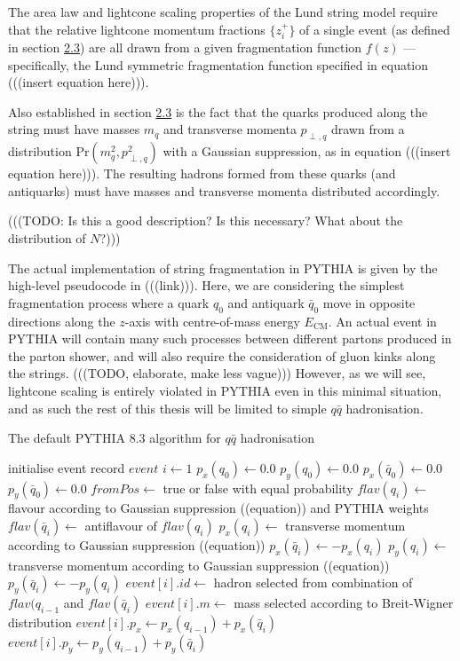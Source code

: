 \documentclass[12pt,a4paper]{report}
\begin{document}
The area law and lightcone scaling properties of the Lund string model require that the relative lightcone momentum fractions $\{ z_i^+ \}$ of a single event (as defined in section \hyperref[sec:lsm]{2.3}) are all drawn from a given fragmentation function $f(z)$ --- specifically, the Lund symmetric fragmentation function specified in equation (((insert equation here))).

Also established in section \hyperref[sec:lsm]{2.3} is the fact that the quarks produced along the string must have masses $m_q$ and transverse momenta $p_{\perp,q}$ drawn from a distribution $\text{Pr}(m_q^2, p_{\perp,q}^2)$ with a Gaussian suppression, as in equation (((insert equation here))). The resulting hadrons formed from these quarks (and antiquarks) must have masses and transverse momenta distributed accordingly.

(((TODO: Is this a good description? Is this necessary? What about the distribution of $N$?)))

The actual implementation of string fragmentation in PYTHIA is given by the high-level pseudocode in (((link))). Here, we are considering the simplest fragmentation process where a quark $q_0$ and antiquark $\bar{q}_0$ move in opposite directions along the $z$-axis with centre-of-mass energy $E_\text{CM}$. An actual event in PYTHIA will contain many such processes between different partons produced in the parton shower, and will also require the consideration of gluon kinks along the strings. (((TODO, elaborate, make less vague))) However, as we will see, lightcone scaling is entirely violated in PYTHIA even in this minimal situation, and as such the rest of this thesis will be limited to simple $q \bar{q}$ hadronisation.

\begin{algorithm}
  \caption{The default PYTHIA 8.3 algorithm for $q\bar{q}$ hadronisation} \label{alg:default}
  \begin{algorithmic}
    \State initialise event record $event$
    \State $i \gets 1$
    \State $p_x(q_0) \gets 0.0$
    \State $p_y(q_0) \gets 0.0$
    \State $p_x(\bar{q}_0) \gets 0.0$
    \State $p_y(\bar{q}_0) \gets 0.0$
    \Loop
    \State $fromPos \gets$ true or false with equal probability
    \State $flav(q_i) \gets$ flavour according to Gaussian suppression ((equation)) and PYTHIA weights
    \State $flav(\bar{q}_i) \gets$ antiflavour of $flav(q_i)$
    \State $p_x(q_i) \gets$ transverse momentum according to Gaussian suppression ((equation))
    \State $p_x(\bar{q}_i) \gets -p_x(q_i)$
    \State $p_y(q_i) \gets$ transverse momentum according to Gaussian suppression ((equation))
    \State $p_y(\bar{q}_i) \gets -p_y(q_i)$ 
    \State $event[i].id \gets$ hadron selected from combination of $flav(q_{i-1}$ and $flav(\bar{q}_i)$
    \State $event[i].m \gets$ mass selected according to Breit-Wigner distribution
    \State $event[i].p_x \gets p_x(q_{i-1}) + p_x(\bar{q}_i)$
    \State $event[i].p_y \gets p_y(q_{i-1}) + p_y(\bar{q}_i)$
    \Else
    \EndIf
    \EndLoop
    \EndProcedure
  \end{algorithmic}
\end{algorithm}
\end{document}

